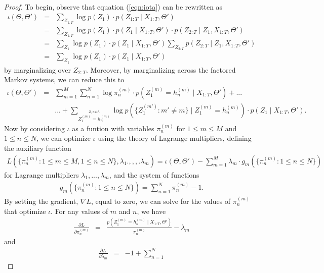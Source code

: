 \documentclass{amsart}
\begin{document}
\begin{proof}
To begin, observe that equation (\ref{eqn:iota}) can be rewritten as 
\begin{eqnarray*}
\iota(\Theta,\Theta') &=& \sum_{Z_{1:T}}\log p(Z_1)\cdot p(Z_{1:T}\mid 
X_{1:T},\Theta')\\
& = & \sum_{Z_{1:T}}\log p(Z_1)\cdot p(Z_1\mid X_{1:T},\Theta')\cdot 
p(Z_{2:T}\mid Z_1,X_{1:T},\Theta')\\
& = & \sum_{Z_1} \log p(Z_1)\cdot p(Z_1\mid 
X_{1:T},\Theta')\sum_{Z_{2:T}}p(Z_{2:T}\mid Z_1,X_{1:T},\Theta')\\
& = & \sum_{Z_1} \log p(Z_1)\cdot p(Z_1\mid 
X_{1:T},\Theta')
\end{eqnarray*}
by marginalizing over $Z_{2:T}$.  Moreover, by marginalizing across the 
factored Markov systems, we can reduce this to 
\begin{eqnarray*}
\iota(\Theta,\Theta')& = & \sum_{m=1}^M\sum_{n=1}^N 
\log\pi_n^{(m)}\cdot p(Z_1^{(m)} = h_n^{(m)}\mid X_{1:T},\Theta') + ...\\
& & ...+\sum_{\stackrel{Z_1 with }{Z_1^{(m)}=h_n^{(m)}}}\log 
p(\{Z_1^{(m')}:m'\neq m\}\mid Z_1^{(m)}=h_n^{(m)})\cdot p(Z_1\mid 
X_{1:T},\Theta').
\end{eqnarray*}
Now by considering $\iota$ as a funtion with variables $\pi_n^{(m)}$ 
for $1\leq m\leq M$ and $1\leq n\leq N$, we can optimize $\iota$ using the theory of Lagrange multipliers, 
defining the auxiliary function 
\begin{eqnarray*}
L(\{\pi_n^{(m)}:1\leq m\leq M,1\leq n\leq N\}, 
\lambda_1.,,,.\lambda_m)=\iota(\Theta,\Theta')-\sum_{m=1}^M 
\lambda_m\cdot g_m(\{\pi_n^{(m)}:1\leq n\leq N\})
\end{eqnarray*}
for Lagrange multipliers $\lambda_1,...,\lambda_m$, and the system of functions 
\begin{eqnarray*}
g_m(\{\pi_n^{(m)}:1\leq n\leq N\}) = \sum_{n=1}^N \pi_n^{(m)} -1.
\end{eqnarray*}
By setting the gradient, $\nabla L$, equal to zero, we can solve for the 
values of 
$\pi_n^{(m)}$ that optimize $\iota$. For any values of $m$ and $n$, we 
have 
\begin{eqnarray}\label{eqn:partial_L_iota1}
\frac{\partial L}{\partial \pi_n^{(m)}} & = &
\frac{p(Z_1^{(m)} = h_n^{(m)}\mid X_{1:T},\Theta')}{\pi_n^{(m)}} - 
\lambda_m
\end{eqnarray}
and 
\begin{eqnarray}\label{eqn:partial_L_iota2}
\frac{\partial L}{\partial \lambda_m} & = &-1 +\sum_{n=1}^N 

\end{eqnarray}
\end{proof}
\end{document}
